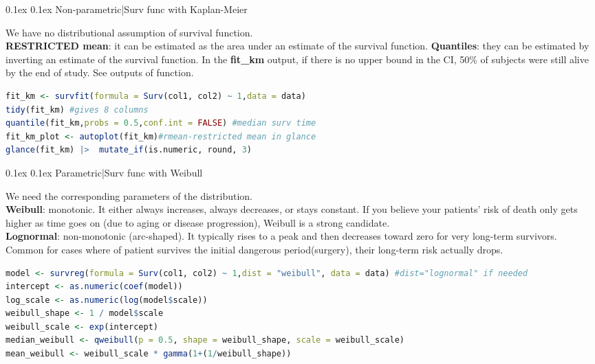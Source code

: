 \documentclass[8pt,landscape]{article}
\makeatletter
\renewcommand{\subsection}{\@startsection{subsection}{2}{0pt}%
    {0.1ex}%
    {0.1ex}%
    {\fontsize{8}{9}\bfseries\color{blue}}} %
\newcommand{\smalltext}[1]{
  {\fontsize{8}{9}\selectfont\sloppy #1\par}
}
\makeatother
\begin{document}
\begin{multicols}{3}
\subsection{Non-parametric|Surv func with Kaplan-Meier}
\smalltext{
We have no distributional assumption of survival function. \\
\textbf{RESTRICTED mean}: it can be estimated as the area under an estimate of the survival function.
\textbf{Quantiles}: they can be estimated by inverting an estimate of the survival function.
In the \textbf{fit\_km} output, if there is no upper bound in the CI, 50\% of subjects were still alive by the end of study. See outputs of function.
}
\begin{lstlisting}[language=R]
fit_km <- survfit(formula = Surv(col1, col2) ~ 1,data = data)
tidy(fit_km) #gives 8 columns
quantile(fit_km,probs = 0.5,conf.int = FALSE) #median surv time
fit_km_plot <- autoplot(fit_km)#rmean-restricted mean in glance
glance(fit_km) |>  mutate_if(is.numeric, round, 3) 
\end{lstlisting}

\subsection{Parametric|Surv func with Weibull}
\smalltext{
  We need the corresponding parameters of the distribution.\\
  \textbf{Weibull}: monotonic. It either always increases, always decreases, or stays constant. 
  If you believe your patients' risk of death only gets higher as time goes on (due to aging or disease progression), Weibull is a strong candidate. \\
  \textbf{Lognormal}: non-monotonic (arc-shaped). It typically rises to a peak and then decreases toward zero for very long-term survivors. Common for cases where of patient survives the initial dangerous period(surgery), their long-term risk actually drops.
}

\begin{lstlisting}[language=R]
model <- survreg(formula = Surv(col1, col2) ~ 1,dist = "weibull", data = data) #dist="lognormal" if needed 
intercept <- as.numeric(coef(model))
log_scale <- as.numeric(log(model$scale))
weibull_shape <- 1 / model$scale
weibull_scale <- exp(intercept)
median_weibull <- qweibull(p = 0.5, shape = weibull_shape, scale = weibull_scale)
mean_weibull <- weibull_scale * gamma(1+(1/weibull_shape))
\end{lstlisting}


\end{multicols}
\end{document}
